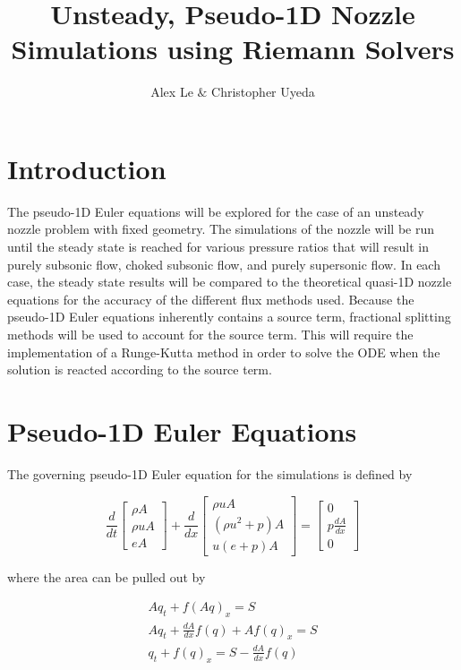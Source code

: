 \documentclass{article}%
\title{Unsteady, Pseudo-1D Nozzle Simulations using Riemann Solvers}
\author{Alex Le $\&$ Christopher Uyeda}
\numberwithin{equation}{section}
\begin{document}
\maketitle

\section{Introduction}
The pseudo-1D Euler equations will be explored for the case of an unsteady nozzle problem with fixed geometry. The simulations of the nozzle will be run until the steady state is reached for various pressure ratios that will result in purely subsonic flow, choked subsonic flow, and purely supersonic flow. In each case, the steady state results will be compared to the theoretical quasi-1D nozzle equations for the accuracy of the different flux methods used. Because the pseudo-1D Euler equations inherently contains a source term, fractional splitting methods will be used to account for the source term. This will require the implementation of a Runge-Kutta method in order to solve the ODE when the solution is reacted according to the source term.

\section{Pseudo-1D Euler Equations}
The governing pseudo-1D Euler equation for the simulations is defined by

\begin{equation}
\frac{d}{dt} \left[ \begin{array}{c} \rho A \\ \rho u A \\ e A \end{array} \right] + \frac{d}{dx} \left[ \begin{array}{c} \rho u A \\ (\rho u^2 + p) A \\ u(e + p)A \end{array} \right] = \left[ \begin{array}{c} 0 \\ p \frac{dA}{dx} \\ 0 \end{array} \right] \label{psuedoeuler}
\end{equation}

where the area can be pulled out by

\begin{equation*}
\begin{split}
A q_t + f(A q)_x = S \\
A q_t + \frac{dA}{dx} f(q) + A f(q)_x = S \\
q_t + f(q)_x = S - \frac{dA}{dx} f(q) \\
\end{split}
\end{equation*}
\end{document}
